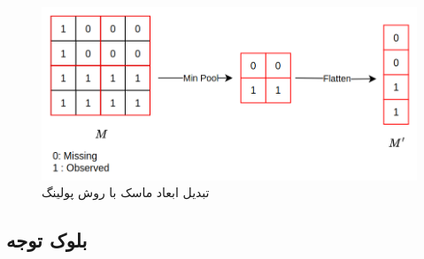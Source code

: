 %
%
%

\begin{figure}
	\centering
	\includegraphics[width=1\linewidth]{maskConv1}
	\caption{تبدیل ابعاد ماسک با روش پولینگ}
	\label{fig:maskconv1}
\end{figure}

\subsection{بلوک توجه}

